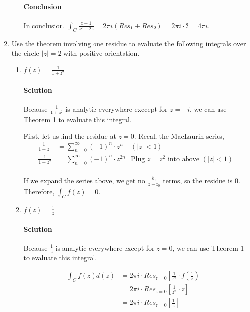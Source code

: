 \documentclass[11pt]{article}
\begin{document}
\begin{enumerate}
\begin{enumerate}
		\paragraph{Conclusion}
		In conclusion, $\int_C \frac{z+1}{z^2 - 2z} = 2\pi i(Res_1 + Res_2) = 2\pi i \cdot 2 = 4\pi i$.
	\end{enumerate}
	
	\item Use the theorem involving one residue to evaluate the following integrals over the circle $|z| = 2$ with positive orientation.
	
	\begin{enumerate}
		\item $f(z) = \frac{1}{1 + z^2}$
		\paragraph{Solution} Because $\frac{1}{1 + z^2}$ is analytic everywhere exccept for $z = \pm i$, we can use Theorem 1 to evaluate this integral.
		
		First, let us find the residue at $z = 0$. Recall the MacLaurin series,
		\[\begin{aligned}
			\frac{1}{1 + z}
			&= \sum^{\infty}_{n=0} (-1)^n \cdot z^n & (|z| < 1) \\
			\frac{1}{1 + z^2}
			&= \sum^{\infty}_{n=0} (-1)^n \cdot z^{2n} & \text{Plug $z = z^2$ into above } (|z| < 1) \\
		\end{aligned}\]
		
		If we expand the series above, we get no $\frac{b_1}{z - z_0}$ terms, so the residue is 0. Therefore, $\int_C f(z) = 0$.
		
		\item $f(z) = \frac{1}{z}$
		
		\paragraph{Solution} Because $\frac{1}{z}$ is analytic everywhere except for $z = 0$, we can use Theorem 1 to evaluate this integral.
		
		\[\begin{aligned}
		\int_C f(z) d(z) &=
		2\pi i \cdot Res_{z=0} [\frac{1}{z^2} \cdot f(\frac{1}{z})] \\
		&= 2\pi i \cdot Res_{z=0} [\frac{1}{z^2} \cdot z] \\
		&= 2\pi i \cdot Res_{z=0} [\frac{1}{z}]
		\end{aligned}\]


\end{enumerate}
\end{enumerate}
\end{document}
